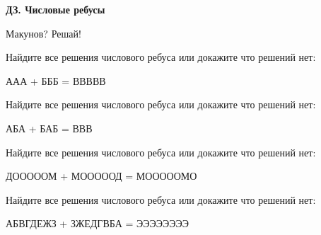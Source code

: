 \centerline{\bf \Huge ДЗ. Числовые ребусы}
\centerline{\bf \Huge }


\begin{flushright}
        \scriptsize{Макунов? Решай!}
\end{flushright}

 Найдите все решения числового ребуса или докажите что решений нет:

ААА + БББ = ВВВВВ

 Найдите все решения числового ребуса или докажите что решений нет:

АБА + БАБ = ВВВ

 Найдите все решения числового ребуса или докажите что решений нет:

ДОООООМ + МОООООД = МОООООМО

 Найдите все решения числового ребуса или докажите что решений нет:

АБВГДЕЖЗ + ЗЖЕДГВБА = ЭЭЭЭЭЭЭЭ